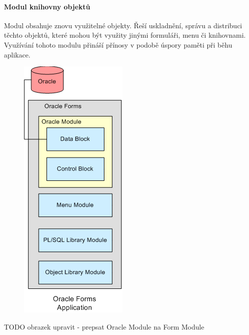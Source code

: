\documentclass{bakalarka}
\begin{document}
\paragraph{Modul knihovny objektů}
Modul obsahuje znovu využitelné objekty. Řeší uskladnění, správu a distribuci těchto objektů, které mohou být využity jinými formuláři, menu či knihovnami. Využívání tohoto modulu přináší přínosy v podobě úspory paměti při běhu aplikace.

\begin{figure}[H]
  \centering
  \includegraphics[scale=0.8]{obr/forms_arch3.png}
  \label{}
\end{figure}
TODO obrazek upravit - prepsat Oracle Module na Form Module
\end{document}
